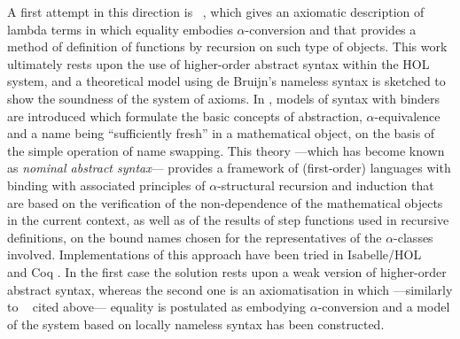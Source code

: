 \documentclass{entcs}
\begin{document}
A first attempt in this direction is ~\cite{DBLP:conf/tphol/GordonM96}, which gives an axiomatic description of lambda terms in which equality embodies $\alpha$-conversion and that provides a method of definition of functions by recursion on such type of objects. This work ultimately rests upon the use of higher-order abstract syntax within the HOL system, and a theoretical model using de Bruijn's nameless syntax is sketched to show the soundness of the system of axioms.
In \cite{Gabbay,Pitts1,Pitts2}, models of syntax with binders are introduced which formulate the basic concepts of abstraction, $\alpha$-equivalence and a name being ``sufficiently fresh'' in a mathematical object, on the basis of the simple operation of name swapping. This theory ---which has become known as \emph{nominal abstract syntax}--- provides a framework of (first-order) languages with binding with associated principles of $\alpha$-structural recursion and induction that are based on the verification of the non-dependence of the mathematical objects in the current context, as well as of the results of step functions used in recursive definitions, on the bound names chosen for the representatives of the $\alpha$-classes involved.
Implementations of this approach have been tried in Isabelle/HOL ~\cite{urban05} and Coq \cite{aydemir}. In the first case the solution rests upon a weak version of higher-order abstract syntax, whereas the second one is an axiomatisation in which ---similarly to ~\cite{DBLP:conf/tphol/GordonM96} cited above--- equality is postulated as embodying $\alpha$-conversion and a model of the system based on locally nameless syntax has been constructed.
\end{document}
